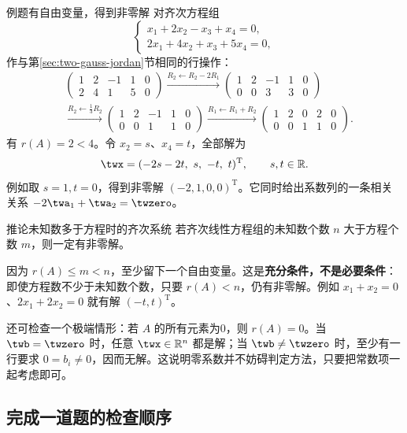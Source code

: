 \documentclass[a4paper,12pt,twoside,openany,fontset=none]{ctexbook}
\renewcommand{\le}{\leqslant}
\newenvironment{corollary}[1][]{\begin{thmBox}{推论}{#1}}{\end{thmBox}}
\newcounter{example}[chapter]
\newenvironment{example}[1][]{\begin{exBox}{例题}{#1}}{\end{exBox}}
\numberwithin{equation}{chapter}
\begin{document}
\begin{example}[有自由变量，得到非零解]
对齐次方程组
\[
    \begin{cases}x_1+2x_2-x_3+x_4=0,\\2x_1+4x_2+x_3+5x_4=0,\end{cases}
\]
作与第\ref{sec:two-gauss-jordan}节相同的行操作：
\[
\begin{aligned}
 &\left(\begin{array}{rrrr|r}1&2&-1&1&0\\2&4&1&5&0\end{array}\right)
 \xrightarrow{R_2\leftarrow R_2-2R_1}
 \left(\begin{array}{rrrr|r}1&2&-1&1&0\\0&0&3&3&0\end{array}\right)\\[5pt]
 &\xrightarrow{R_2\leftarrow\frac13R_2}
 \left(\begin{array}{rrrr|r}1&2&-1&1&0\\0&0&1&1&0\end{array}\right)
 \xrightarrow{R_1\leftarrow R_1+R_2}
 \left(\begin{array}{rrrr|r}1&2&0&2&0\\0&0&1&1&0\end{array}\right).
\end{aligned}
\]
有 $r(A)=2<4$。令 $x_2=s$、$x_4=t$，全部解为
\[
    \twx=(-2s-2t,\ s,\ -t,\ t)^{\mathrm T},\qquad s,t\in\mathbb R.
\]
例如取 $s=1,t=0$，得到非零解 $(-2,1,0,0)^{\mathrm T}$。它同时给出系数列的一条相关关系 $-2\twa_1+\twa_2=\twzero$。
\end{example}

\begin{corollary}[未知数多于方程时的齐次系统]
若齐次线性方程组的未知数个数 $n$ 大于方程个数 $m$，则一定有非零解。
\end{corollary}

因为 $r(A)\le m<n$，至少留下一个自由变量。这是\textbf{充分条件，不是必要条件}：即使方程数不少于未知数个数，只要 $r(A)<n$，仍有非零解。例如 $x_1+x_2=0$、$2x_1+2x_2=0$ 就有解 $(-t,t)^{\mathrm T}$。

还可检查一个极端情形：若 $A$ 的所有元素为0，则 $r(A)=0$。当 $\twb=\twzero$ 时，任意 $\twx\in\mathbb R^n$ 都是解；当 $\twb\ne\twzero$ 时，至少有一行要求 $0=b_i\ne0$，因而无解。这说明零系数并不妨碍判定方法，只要把常数项一起考虑即可。

\subsection*{完成一道题的检查顺序}
\end{document}
